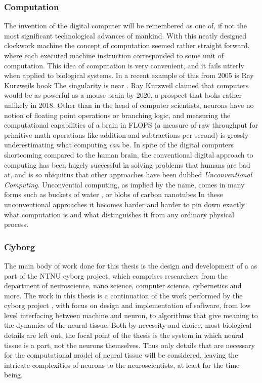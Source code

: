 \subsubsection{Computation}
The invention of the digital computer will be remembered as one of, if not the
most significant technological advances of mankind.
%
With this neatly designed clockwork machine the concept of computation seemed
rather straight forward, where each executed machine instruction corresponded to
some unit of computation.
%
This idea of computation is very convenient, and it fails utterly when
applied to biological systems.
In a recent example of this from 2005 is Ray Kurzweils book The singularity is
near \cite{KURZWEIL2005}.
Ray Kurzweil claimed that computers would be as powerful as a
mouse brain by 2020, a prospect that looks rather unlikely in 2018.
Other than in the head of computer scientists, neurons have no notion of
floating point operations or branching logic, and measuring the computational
capabilities of a brain in FLOPS (a measure of raw throughput for primitive math
operations like addition and subtractions per second) is grossly underestimating
what computing \emph{can} be.
%
In spite of the digital computers shortcoming compared to the human brain, the
conventional digital approach to computing has been hugely successful in solving
problems that humans are bad at, and is so ubiquitus that other approaches
have been dubbed \emph{Unconventional Computing}.
%
Unconvential computing, as implied by the name, comes in many forms such as
buckets of water \cite{FERNANDO2003}, or blobs of carbon nanotubes
\cite{LYKKEBOICES2014}
%
In these unconventional approaches it becomes harder and harder to pin down
exactly what computation is and what distinguishes it from any ordinary physical
process.
\subsubsection{Cyborg}
The main body of work done for this thesis is the design and development of a as
part of the NTNU cyborg project\cite{ntnu_cyborg}, which comprises
researchers from the department of neuroscience, nano science, computer science,
cybernetics and more.
The work in this thesis is a continuation of the work performed by the cyborg
project \cite{TMAC}, with focus on design and implementation of software, from
low level interfacing between machine and neuron, to algorithms that give
meaning to the dynamics of the neural tissue.
Both by necessity and choice, most biological details are left out, the focal
point of the thesis is the system in which neural tissue is a part, not the
neurons themselves.
Thus only details that are necessary for the computational model of neural
tissue will be considered, leaving the intricate complexities of neurons to the
neuroscientists, at least for the time being.
\cleardoublepage

